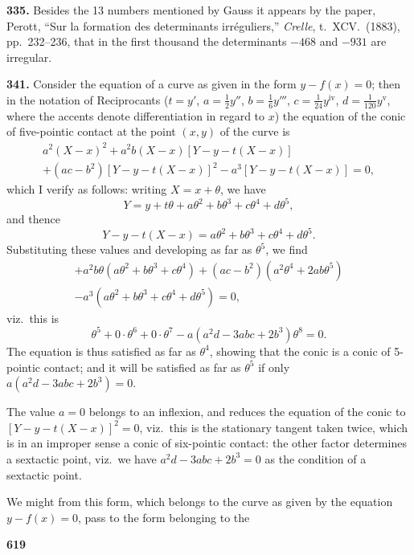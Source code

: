 \documentclass[12pt,a4paper]{article}
\theoremstyle{plain}
\begin{document}
\vspace{0.3cm}
\noindent\textbf{335.} Besides the 13 numbers mentioned by Gauss it appears by the paper, Perott, ``Sur la formation des determinants irr\'{e}guliers,'' \textit{Crelle}, t.~XCV.~(1883), pp.~232--236, that in the first thousand the determinants $-468$ and $-931$ are irregular.

\vspace{0.3cm}
\noindent\textbf{341.} Consider the equation of a curve as given in the form $y-f(x)=0$; then in the notation of Reciprocants ($t=y'$, $a=\frac{1}{2}y''$, $b=\frac{1}{6}y'''$, $c=\frac{1}{24}y^{\mathrm{iv}}$, $d=\frac{1}{120}y^{\mathrm{v}}$, where the accents denote differentiation in regard to $x$) the equation of the conic of five-pointic contact at the point $(x,y)$ of the curve is
\begin{multline*}
a^2(X-x)^2 + a^2b(X-x)[Y-y-t(X-x)] \\
+ (ac-b^2)[Y-y-t(X-x)]^2 - a^3[Y-y-t(X-x)] = 0,
\end{multline*}
which I verify as follows: writing $X=x+\theta$, we have
\[Y = y + t\theta + a\theta^2 + b\theta^3 + c\theta^4 + d\theta^5,\]
and thence
\[Y-y-t(X-x) = a\theta^2 + b\theta^3 + c\theta^4 + d\theta^5.\]
Substituting these values and developing as far as $\theta^5$, we find
\begin{multline*}
+ a^2b\theta(a\theta^2+b\theta^3+c\theta^4) + (ac-b^2)(a^2\theta^4+2ab\theta^5) \\
- a^3(a\theta^2+b\theta^3+c\theta^4+d\theta^5) = 0,
\end{multline*}
viz.~this is
\[\theta^5 + 0\cdot\theta^6 + 0\cdot\theta^7 - a(a^2d-3abc+2b^3)\theta^8 = 0.\]
The equation is thus satisfied as far as $\theta^4$, showing that the conic is a conic of 5-pointic contact; and it will be satisfied as far as $\theta^5$ if only $a(a^2d-3abc+2b^3)=0$.

The value $a=0$ belongs to an inflexion, and reduces the equation of the conic to $[Y-y-t(X-x)]^2=0$, viz.~this is the stationary tangent taken twice, which is in an improper sense a conic of six-pointic contact: the other factor determines a sextactic point, viz.~we have $a^2d-3abc+2b^3=0$ as the condition of a sextactic point.

We might from this form, which belongs to the curve as given by the equation $y-f(x)=0$, pass to the form belonging to the

\newpage
\noindent\textbf{619}
\end{document}
